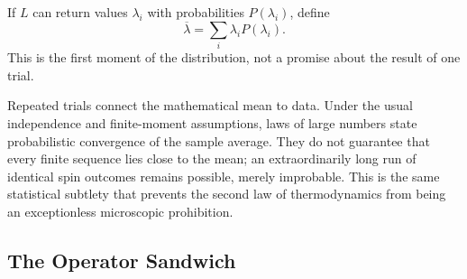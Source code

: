 If \(L\) can return values \(\lambda_i\) with probabilities \(P(\lambda_i)\), define
\begin{equation}
\overline{\lambda}=\sum_i\lambda_iP(\lambda_i).
\label{eq:l4-probability-average}
\end{equation}
This is the first moment of the distribution, not a promise about the result of one trial.

\begin{classroomqa}
\end{classroomqa}

Repeated trials connect the mathematical mean to data. Under the usual independence and finite-moment assumptions, laws of large numbers state probabilistic convergence of the sample average. They do not guarantee that every finite sequence lies close to the mean; an extraordinarily long run of identical spin outcomes remains possible, merely improbable. This is the same statistical subtlety that prevents the second law of thermodynamics from being an exceptionless microscopic prohibition.

\begin{classroomqa}
\end{classroomqa}

\subsection{The Operator Sandwich}

